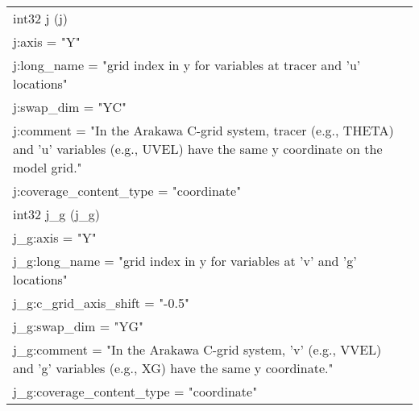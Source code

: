 \begin{longtable}{|p{\textwidth}|}
\rowcolor{Apricot}\hspace{0.5cm}int32 j (j)\\
\rowcolor{Apricot}\hspace{0.5cm}\hspace{0.5cm}j:axis = "Y"\\
\rowcolor{Apricot}\hspace{0.5cm}\hspace{0.5cm}j:long\_name = "grid index in y for variables at tracer and 'u' locations"\\
\rowcolor{Apricot}\hspace{0.5cm}\hspace{0.5cm}j:swap\_dim = "YC"\\
\rowcolor{Apricot}\hspace{0.5cm}\hspace{0.5cm}j:comment = "In the Arakawa C-grid system, tracer (e.g., THETA) and 'u' variables (e.g., UVEL) have the same y coordinate on the model grid."\\
\rowcolor{Apricot}\hspace{0.5cm}\hspace{0.5cm}j:coverage\_content\_type = "coordinate"\\
\rowcolor{Apricot}\hspace{0.5cm}int32 j\_g (j\_g)\\
\rowcolor{Apricot}\hspace{0.5cm}\hspace{0.5cm}j\_g:axis = "Y"\\
\rowcolor{Apricot}\hspace{0.5cm}\hspace{0.5cm}j\_g:long\_name = "grid index in y for variables at 'v' and 'g' locations"\\
\rowcolor{Apricot}\hspace{0.5cm}\hspace{0.5cm}j\_g:c\_grid\_axis\_shift = "-0.5"\\
\rowcolor{Apricot}\hspace{0.5cm}\hspace{0.5cm}j\_g:swap\_dim = "YG"\\
\rowcolor{Apricot}\hspace{0.5cm}\hspace{0.5cm}j\_g:comment = "In the Arakawa C-grid system, 'v' (e.g., VVEL) and 'g' variables (e.g., XG) have the same y coordinate."\\
\rowcolor{Apricot}\hspace{0.5cm}\hspace{0.5cm}j\_g:coverage\_content\_type = "coordinate"\\

\end{longtable}
